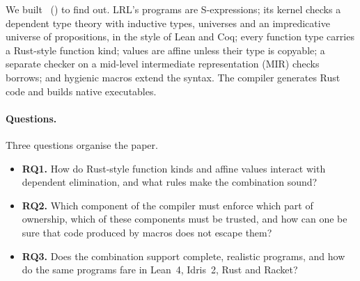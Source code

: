 We built \LRL\ (\lrl) to find out.
LRL's programs are S-expressions; its kernel checks a dependent type theory with inductive types, universes and an impredicative universe of propositions, in the style of Lean and Coq; every function type carries a Rust-style function kind; values are affine unless their type is copyable; a separate checker on a mid-level intermediate representation (MIR) checks borrows; and hygienic macros extend the syntax.
The compiler generates Rust code and builds native executables.

\paragraph{Questions.}
Three questions organise the paper.
\begin{itemize}\setlength\itemsep{2pt}
\item \textbf{RQ1.} How do Rust-style function kinds and affine values interact with dependent elimination, and what rules make the combination sound?
\item \textbf{RQ2.} Which component of the compiler must enforce which part of ownership, which of these components must be trusted, and how can one be sure that code produced by macros does not escape them?
\item \textbf{RQ3.} Does the combination support complete, realistic programs, and how do the same programs fare in Lean~4, Idris~2, Rust and Racket?
\end{itemize}


